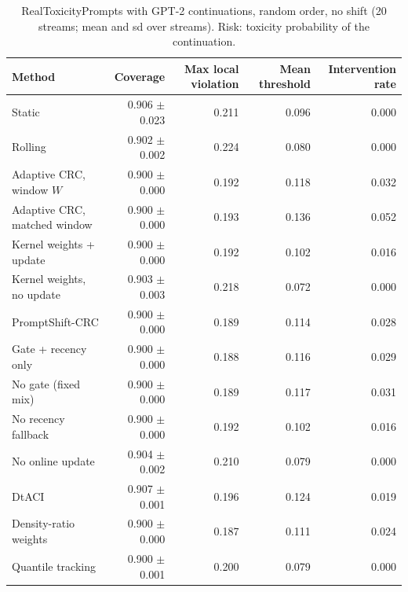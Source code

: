 \begin{table}[H]
\centering
\small
\caption{RealToxicityPrompts with GPT-2 continuations, random order, no shift (20 streams; mean and sd over streams). Risk: toxicity probability of the continuation.}
\label{tab:rtp_iid}
\begin{tabular}{lrrrr}
\toprule
Method & Coverage & Max local violation & Mean threshold & Intervention rate \\
\midrule
Static & 0.906 $\pm$ 0.023 & 0.211 & 0.096 & 0.000 \\
Rolling & 0.902 $\pm$ 0.002 & 0.224 & 0.080 & 0.000 \\
Adaptive CRC, window $W$ & 0.900 $\pm$ 0.000 & 0.192 & 0.118 & 0.032 \\
Adaptive CRC, matched window & 0.900 $\pm$ 0.000 & 0.193 & 0.136 & 0.052 \\
Kernel weights + update & 0.900 $\pm$ 0.000 & 0.192 & 0.102 & 0.016 \\
Kernel weights, no update & 0.903 $\pm$ 0.003 & 0.218 & 0.072 & 0.000 \\
PromptShift-CRC & 0.900 $\pm$ 0.000 & 0.189 & 0.114 & 0.028 \\
Gate + recency only & 0.900 $\pm$ 0.000 & 0.188 & 0.116 & 0.029 \\
No gate (fixed mix) & 0.900 $\pm$ 0.000 & 0.189 & 0.117 & 0.031 \\
No recency fallback & 0.900 $\pm$ 0.000 & 0.192 & 0.102 & 0.016 \\
No online update & 0.904 $\pm$ 0.002 & 0.210 & 0.079 & 0.000 \\
DtACI & 0.907 $\pm$ 0.001 & 0.196 & 0.124 & 0.019 \\
Density-ratio weights & 0.900 $\pm$ 0.000 & 0.187 & 0.111 & 0.024 \\
Quantile tracking & 0.900 $\pm$ 0.001 & 0.200 & 0.079 & 0.000 \\
\bottomrule
\end{tabular}
\end{table}

